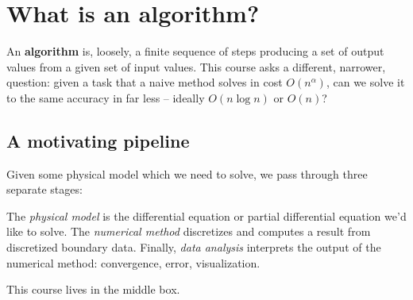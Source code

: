 \newpage
\section{What is an algorithm?}
An \textbf{algorithm} is, loosely, a finite sequence of steps producing a set of 
output values from a given set of input values. This course asks a different, 
narrower, question: given a task that a naive method solves in cost $O(n^{\alpha})$,
can we solve it to the same accuracy in far less -- ideally $O(n\log{n})$ or 
$O(n)$?

\subsection{A motivating pipeline}
Given some physical model which we need to solve, we pass through three 
separate stages:

\begin{figure}[h]
\centering
{}
\label{fig:pipeline}
\end{figure}

The \textit{physical model} is the differential equation or partial differential
equation we'd like to solve. The \textit{numerical method} discretizes and 
computes a result from discretized boundary data. Finally, \textit{data analysis}
interprets the output of the numerical method: convergence, error, visualization.

\begin{note} 
    This course lives in the middle box.
\end{note}

